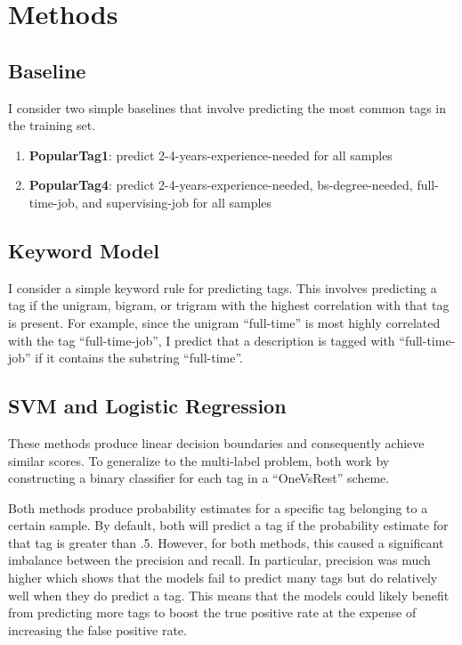 \documentclass{article}
\begin{document}
\section{Methods}
\subsection{Baseline}
I consider two simple baselines that involve predicting the most common tags in the training set.

\begin{enumerate}
	\item \textbf{PopularTag1}: predict 2-4-years-experience-needed for all samples
	\item \textbf{PopularTag4}: predict 2-4-years-experience-needed, bs-degree-needed, full-time-job, and supervising-job for all samples
\end{enumerate}

\subsection{Keyword Model}
I consider a simple keyword rule for predicting tags. This involves predicting a tag if the unigram, bigram, or trigram with the highest correlation with that tag is present. For example, since the unigram ``full-time'' is most highly correlated with the tag ``full-time-job'', I predict that a description is tagged with ``full-time-job'' if it contains the substring ``full-time''.

\subsection{SVM and Logistic Regression}
These methods produce linear decision boundaries and consequently achieve similar scores. To generalize to the multi-label problem, both work by constructing a binary classifier for each tag in a ``OneVsRest'' scheme. 

Both methods produce probability estimates for a specific tag belonging to a certain sample. By default, both will predict a tag if the probability estimate for that tag is greater than .5. However, for both methods, this caused a significant imbalance between the precision and recall. In particular, precision was much higher which shows that the models fail to predict many tags but do relatively well when they do predict a tag. This means that the models could likely benefit from predicting more tags to boost the true positive rate at the expense of increasing the false positive rate.
\end{document}
